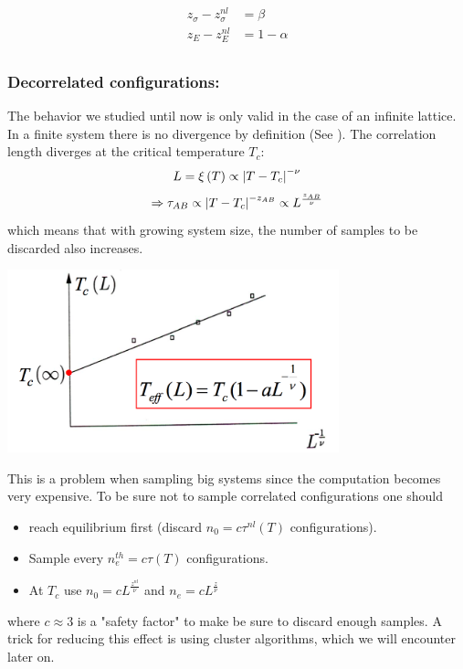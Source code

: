 \begin{align}
z_\sigma - z_\sigma^{nl} &= \beta \\ 
z_E - z_E^{nl} &=1- \alpha\\
\end{align}


\subsubsection*{Decorrelated configurations:}


\vspace{0.1cm}
\noindent
\begin{minipage}{\textwidth}
\begin{minipage}{.48\textwidth}
\noindent

The behavior we studied until now is only valid in the case of an infinite lattice. In a finite system there is no divergence by definition (See \citet{comp_phys}). The correlation length diverges at the critical temperature $T_c$:
\begin{equation}
L=\xi\left(T\right)\propto \left|T-T_c\right|^{-\nu}
\label{eq:corr_len_div}
\end{equation}
$$\Rightarrow \tau_{AB} \propto \left|T-T_c\right|^{-z_{AB}}\propto L^{\frac{z_{AB}}{\nu}} $$ 
which means that with growing system size, the number of samples to be discarded also increases.


\end{minipage}%
\hfill
\begin{minipage}{.48\textwidth}
  \centering
  \includegraphics[height=150pt]{pics/finite_size}
  \label{fig:finite_size}
\end{minipage}
\end{minipage}
\vspace{0.1cm}

\noindent
This is a problem when sampling big systems since the computation becomes very expensive. To be sure not to sample correlated configurations one should 
\begin{itemize}
\item reach equilibrium first  (discard $n_0 = c \tau^{nl}(T)$ configurations).
\item Sample every $n_e^{th}=c \tau(T)$ configurations.
\item At $T_c$ use $n_0 = c L^{\frac{z^{nl}}{\nu}}$ and $n_e=c L^{\frac{z}{\nu}}$
\end{itemize}
where $c \approx 3$ is a "safety factor" to make be sure to discard enough samples. A trick for reducing this effect is using cluster algorithms, which we will encounter later on.

